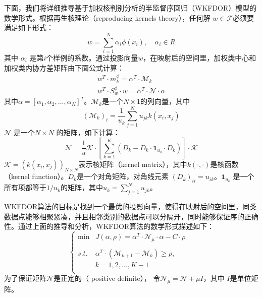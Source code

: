 下面，我们将详细推导基于加权核判别分析的半监督序回归（WKFDOR）模型的数学形式。根据再生核理论（reproducing kernels theory），任何解 \(w\in \mathcal{F}\)必须要满足如下形式：
\begin{equation}
\label{kernel_w}
w=\sum_{i=1}^{N}\alpha_{i}\phi(x_{i}),\quad \alpha_{i} \in R
\end{equation}
其中 \(\alpha_{i}\) 是第\(i\)个样例的系数。通过投影向量\(w\)，在映射后的空间里，加权类中心和加权类内协方差矩阵由下面公式计算：
\begin{gather}
\label{project_mean}
w^{T} \cdot m^{\phi}_{k}=\alpha^{T} \cdot \mathcal{M}_{k} \\
\label{project_cov}
w^{T} \cdot S^{\phi}_{w} \cdot w=\alpha^{T} \cdot \mathcal{N} \cdot \alpha
\end{gather}
其中\(\alpha=[\alpha_{1},\alpha_{2},\dots,\alpha_{N}]^{T}\)。\(\mathcal{M}_{k}\)是一个\(N \times 1\)的列向量，其中
\begin{equation}
\label{M}
(\mathcal{M}_{k})_{i}=\frac{1}{u_{k}}\sum_{j=1}^{N}u_{jk}  k(x_{i},x_{j})
\end{equation}
\(\mathcal{N}\) 是一个\(N\times N\) 的矩阵，如下计算：
\begin{equation}
\label{N}
\mathcal{N}=\frac{1}{u}\mathcal{K}\cdot[\sum_{k=1}^{K}(D_{k}-D_{k} \cdot \mathbf{1}_{u_{k}} \cdot D_{k})]\cdot \mathcal{K}
\end{equation}
\(\mathcal{K}=(k(x_{i},x_{j}))_{N \times N}\)表示核矩阵（kernel matrix），其中\(k(\cdot,\cdot)\)是核函数（kernel function）。\(D_{k}\)是一个对角矩阵，对角线元素 \((D_{k})_{ii}=u_{ik}\)。\(\mathbf{1}_{u_{k}}\) 是一个所有项都等于\(1/u_k\)的矩阵，其中\(u_{k}=\sum_{j=1}^{N}u_{jk}\)。

WKFDOR算法的目标是找到一个最优的投影向量，使得在映射后的空间里，同类数据点能够相聚紧凑，并且相邻类别的数据点可以分隔开，同时能够保证序的正确性。通过上面的推导和分析，WKFDOR算法的数学形式描述如下：
\begin{equation}
\label{wkfdor}
\left\{\begin{array}{rll} \min & J(\alpha,\rho)=\alpha^{T}\cdot \mathcal{N}_{\mu} \cdot \alpha-C\cdot \rho& \\
\\
s.t. & \alpha^{T}\cdot (\mathcal{M}_{k+1}-\mathcal{M}_{k})\geq\rho,{} \\
     & k = 1,2,\dots,K-1\\

\end{array}
\right.
\end{equation}
为了保证矩阵\(\mathcal{N}\)是正定的（ positive definite）， 令\(\mathcal{N}_{\mu}=\mathcal{N}+\mu I\)，其中
\(I\)是单位矩阵。

